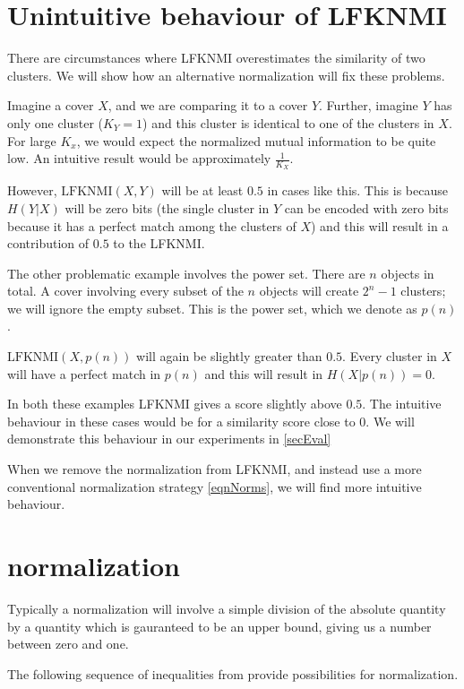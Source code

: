 \documentclass[9pt,technote]{IEEEtran}
\begin{document}
\section{Unintuitive behaviour of LFKNMI}
There are circumstances where LFKNMI overestimates the similarity of two clusters.
We will show how an alternative normalization will fix these problems.

Imagine a cover $X$, and we are comparing it to a cover $Y$. Further, imagine $Y$ has only one
cluster ($K_Y=1$) and this cluster is identical to one of the clusters in $X$.
For large $K_x$, we would expect the normalized mutual information to be quite low.
An intuitive result would be approximately $\frac1{K_X}$.

However, $\mbox{LFKNMI}(X,Y)$ will be at least $0.5$ in cases like this.
This is because $H(Y|X)$ will be zero bits
(the single cluster in $Y$ can be encoded with zero bits because it has a perfect match among the clusters of $X$)
and this will result in a contribution of $0.5$ to the LFKNMI.

The other problematic example involves the power set. There are $n$ objects in total.
A cover involving every subset of the $n$ objects will create $2^n - 1$ clusters; we will ignore the empty subset.
This is the power set, which we denote as $p(n)$.

$\mbox{LFKNMI}(X, p(n))$ will again be slightly greater than $0.5$. Every cluster in $X$ will
have a perfect match in $p(n)$ and this will result in $H(X|p(n)) = 0$.

In both these examples LFKNMI gives a score slightly above $0.5$. The intuitive behaviour
in these cases would be for a similarity score close to $0$.
We will demonstrate this behaviour in our experiments in \cref{secEval}

When we remove the
normalization from LFKNMI, and instead use a more conventional normalization strategy
\cref{eqnNorms}, we will find more intuitive behaviour.

\section{normalization}

Typically a normalization will involve a simple division of the absolute quantity
by a quantity which is gauranteed to be an upper bound, giving us a number between
zero and one.

The following sequence of inequalities from \citet{VinhEppsBailey} provide possibilities for normalization.
\end{document}
